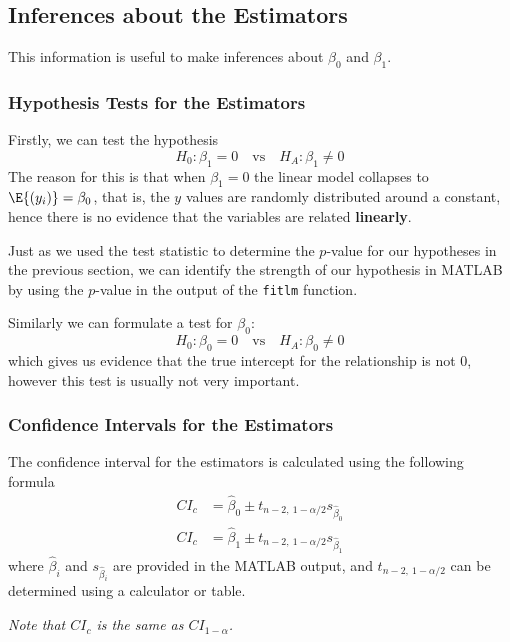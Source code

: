 \documentclass{article}
\begin{document}
\subsection{Inferences about the Estimators}
This information is useful to make inferences about \(\beta_0\) and \(\beta_1\).
\subsubsection{Hypothesis Tests for the Estimators}
Firstly, we can test the hypothesis
\begin{equation*}
    H_0:\beta_1 = 0 \quad \text{vs} \quad H_A:\beta_1 \neq 0
\end{equation*}
The reason for this is that when \(\beta_1 = 0\) the linear model collapses to
\(\E{\left( y_i \right)} = \beta_0\), that is, the \(y\) values are randomly
distributed around a constant, hence there is no evidence that the
variables are related \textbf{linearly}.

Just as we used the test statistic to determine the \(p\)-value for our
hypotheses in the previous section, we can identify the strength of our
hypothesis in MATLAB by using the \(p\)-value in the output of
the \lstinline!fitlm! function.

Similarly we can formulate a test for \(\beta_0\):
\begin{equation*}
    H_0:\beta_0 = 0 \quad \text{vs} \quad H_A:\beta_0 \neq 0
\end{equation*}
which gives us evidence that the true intercept for the relationship is not 0,
however this test is usually not very important.
\subsubsection{Confidence Intervals for the Estimators}
The confidence interval for the estimators is calculated using the following formula
\begin{align*}
    CI_c & = \hat{\beta}_0 \pm t_{n-2,\: 1-\alpha/2} s_{\hat{\beta}_0} \\
    CI_c & = \hat{\beta}_1 \pm t_{n-2,\: 1-\alpha/2} s_{\hat{\beta}_1}
\end{align*}
where \(\hat{\beta}_i\) and \(s_{\hat{\beta}_i}\) are provided in the MATLAB output, and
\(t_{n-2,\: 1-\alpha/2}\) can be determined using a calculator or table.

\textit{Note that \(CI_c\) is the same as \(CI_{1-\alpha}\).}
\end{document}
